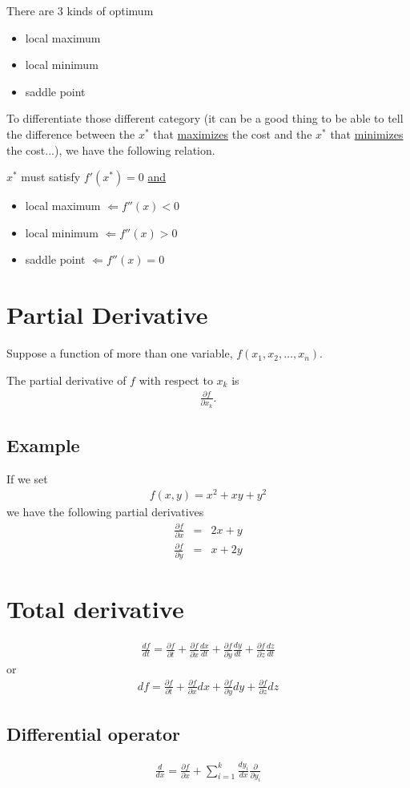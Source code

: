 \documentclass[a4paper] {scrartcl}%
\begin{document}
There are 3 kinds of optimum
\begin{itemize}
	\item local maximum
	\item local minimum
	\item saddle point
\end{itemize}

To differentiate those different category (it can be a good thing to be able to tell the difference between the $x^*$ that \underline{maximizes} the cost and the $x^*$ that \underline{minimizes} the cost...), we have the following relation.

$x^*$ must satisfy $f'(x^*)=0$ \underline{and}
\begin{itemize}
	\item local maximum $\Leftarrow f''(x)<0$ 
	\item local minimum $\Leftarrow f''(x)>0$ 
	\item saddle point $\Leftarrow f''(x)=0$ 
\end{itemize}

\section{Partial Derivative}
Suppose a function of more than one variable, $f(x_1, x_2, \dots, x_n)$.

The partial derivative of $f$ with respect to $x_k$ is
\begin{eqnarray}
	\frac{\partial f}{\partial x_k}.
\end{eqnarray}

\subsection{Example}
If we set
\begin{eqnarray*}
	f(x,y) = x^2+xy+y^2
\end{eqnarray*}
we have the following partial derivatives
\begin{eqnarray*}
	\frac{\partial f}{\partial x}&=&2x+y\\
	\frac{\partial f}{\partial y}&=&x+2y
\end{eqnarray*}

\section{Total derivative}
\begin{eqnarray}
	\frac{df}{dt}=
	\frac{\partial f}{\partial t}
	+\frac{\partial f}{\partial x}\frac{dx}{dt}
	+\frac{\partial f}{\partial y}\frac{dy}{dt}
	+\frac{\partial f}{\partial z}\frac{dz}{dt}
\end{eqnarray}
or
\begin{eqnarray}
	df=
	\frac{\partial f}{\partial t}
	+\frac{\partial f}{\partial x}dx
	+\frac{\partial f}{\partial y}dy
	+\frac{\partial f}{\partial z}dz
\end{eqnarray}

\subsection{Differential operator}
\begin{eqnarray}
	\frac{d}{dx}=
	\frac{\partial f}{\partial x}
	+\sum_{i=1}^k\frac{dy_i}{dx}\frac{\partial }{\partial y_i}
\end{eqnarray}
\end{document}
